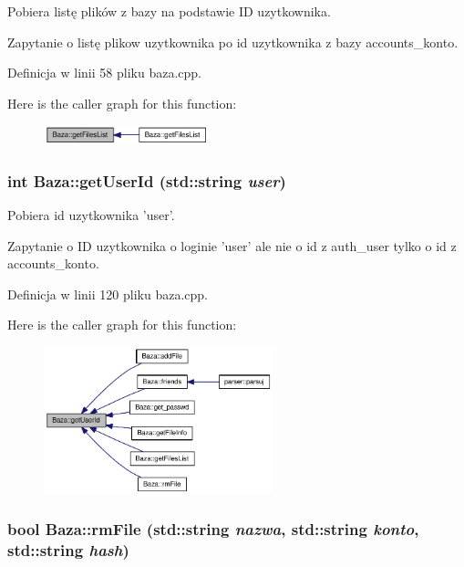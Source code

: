 Pobiera listę plików z bazy na podstawie ID uzytkownika. 

Zapytanie o listę plikow uzytkownika po id uzytkownika z bazy accounts\_\-konto. 

Definicja w linii 58 pliku baza.cpp.

Here is the caller graph for this function:\nopagebreak
\begin{figure}[H]
\begin{center}
\leavevmode
\includegraphics[width=136pt]{d8/d84/a00001_a391c1fd3cb3f0b178ceeed9e4d8652e_icgraph}
\end{center}
\end{figure}
\hypertarget{a00001_65054f08c8fd7c600f6c2fe2c7f61a43}{
\subsubsection[{getUserId}]{\setlength{\rightskip}{0pt plus 5cm}int Baza::getUserId (std::string {\em user})}}
\label{d8/d84/a00001_65054f08c8fd7c600f6c2fe2c7f61a43}


Pobiera id uzytkownika 'user'. 

Zapytanie o ID uzytkownika o loginie 'user' ale nie o id z auth\_\-user tylko o id z accounts\_\-konto. 

Definicja w linii 120 pliku baza.cpp.

Here is the caller graph for this function:\nopagebreak
\begin{figure}[H]
\begin{center}
\leavevmode
\includegraphics[width=188pt]{d8/d84/a00001_65054f08c8fd7c600f6c2fe2c7f61a43_icgraph}
\end{center}
\end{figure}
\hypertarget{a00001_7161c573401166cc5f7d98ae6f335b44}{
\subsubsection[{rmFile}]{\setlength{\rightskip}{0pt plus 5cm}bool Baza::rmFile (std::string {\em nazwa}, \/  std::string {\em konto}, \/  std::string {\em hash})}}
\label{d8/d84/a00001_7161c573401166cc5f7d98ae6f335b44}



